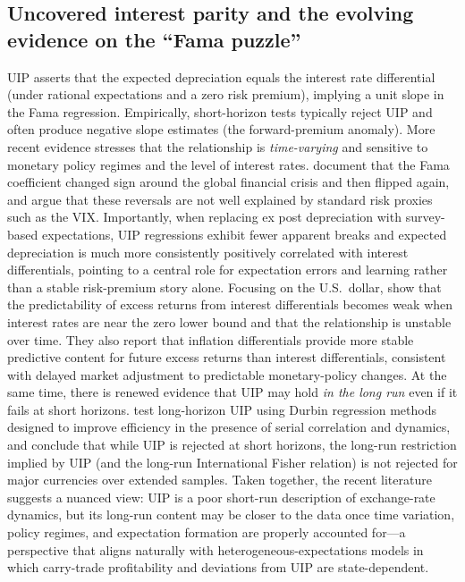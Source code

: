 \documentclass[a4paper,10pt,final]{article}    %
\begin{document}
\subsection{Uncovered interest parity and the evolving evidence on the ``Fama puzzle''}
\label{subsec:uip}

UIP asserts that the expected depreciation equals the interest rate differential (under rational expectations and a zero risk premium), implying a unit slope in the Fama regression. Empirically, short-horizon tests typically reject UIP and often produce negative slope estimates (the forward-premium anomaly). More recent evidence stresses that the relationship is \emph{time-varying} and sensitive to monetary policy regimes and the level of interest rates.
\citet{bussiere2018new} document that the Fama coefficient changed sign around the global financial crisis and then flipped again, and argue that these reversals are not well explained by standard risk proxies such as the VIX. Importantly, when replacing ex post depreciation with survey-based expectations, UIP regressions exhibit fewer apparent breaks and expected depreciation is much more consistently positively correlated with interest differentials, pointing to a central role for expectation errors and learning rather than a stable risk-premium story alone.
Focusing on the U.S.\ dollar, \citet{engel2022reconsideration} show that the predictability of excess returns from interest differentials becomes weak when interest rates are near the zero lower bound and that the relationship is unstable over time. They also report that inflation differentials provide more stable predictive content for future excess returns than interest differentials, consistent with delayed market adjustment to predictable monetary-policy changes.
At the same time, there is renewed evidence that UIP may hold \emph{in the long run} even if it fails at short horizons. \citet{baillie2025yes} test long-horizon UIP using Durbin regression methods designed to improve efficiency in the presence of serial correlation and dynamics, and conclude that while UIP is rejected at short horizons, the long-run restriction implied by UIP (and the long-run International Fisher relation) is not rejected for major currencies over extended samples. Taken together, the recent literature suggests a nuanced view: UIP is a poor short-run description of exchange-rate dynamics, but its long-run content may be closer to the data once time variation, policy regimes, and expectation formation are properly accounted for---a perspective that aligns naturally with heterogeneous-expectations models in which carry-trade profitability and deviations from UIP are state-dependent.
\end{document}
